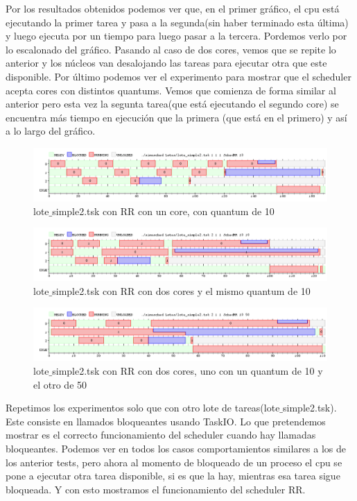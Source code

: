 Por los resultados obtenidos podemos ver que, en el primer gráfico, el cpu está ejecutando la primer tarea y pasa a la segunda(sin haber terminado esta última) y luego ejecuta 
por un tiempo para luego pasar a la tercera. Pordemos verlo por lo escalonado del gráfico. Pasando al caso de dos cores, vemos que se repite lo anterior y los núcleos van 
desalojando las tareas para ejecutar otra que este disponible. Por último podemos ver el experimento para mostrar que el scheduler acepta cores con distintos quantums.
Vemos que comienza de forma similar al anterior pero esta vez la segunta tarea(que está ejecutando el segundo core) se encuentra más tiempo en ejecución que la primera
(que está en el primero) y así a lo largo del gráfico.

\begin{figure}[H]
  \centering
    \includegraphics[width=1.1\textwidth]{imagenes/Ej4Experimento4.png}
  \caption{lote$\_$simple2.tsk con RR con un core, con quantum de 10}
\end{figure}

\begin{figure}[H]
  \centering
    \includegraphics[width=1.1\textwidth]{imagenes/Ej4Experimento5.png}
  \caption{lote$\_$simple2.tsk con RR con dos cores y el mismo quantum de 10}
\end{figure}

\begin{figure}[H]
  \centering
    \includegraphics[width=1.1\textwidth]{imagenes/Ej4Experimento6.png}
  \caption{lote$\_$simple2.tsk con RR con dos cores, uno con un quantum de 10 y el otro de 50}
\end{figure}

Repetimos los experimentos solo que con otro lote de tareas(lote$\_$simple2.tsk). Este consiste en llamados bloqueantes usando TaskIO. Lo que pretendemos mostrar es el correcto funcionamiento 
del scheduler cuando hay llamadas bloqueantes. Podemos ver en todos los casos comportamientos similares a los de los anterior tests, pero ahora al momento de bloqueado de 
un proceso el cpu se pone a ejecutar otra tarea disponible, si es que la hay, mientras esa tarea sigue bloqueada. Y con esto mostramos el funcionamiento del scheduler RR.
